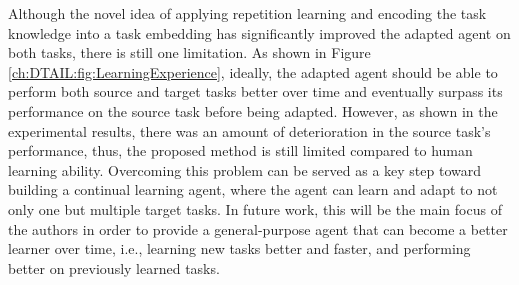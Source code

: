 Although the novel idea of applying repetition learning and encoding the task knowledge into a task embedding has significantly improved the adapted agent on both tasks,
there is still one limitation.
As shown in Figure \ref{ch:DTAIL:fig:LearningExperience},
ideally,
the adapted agent should be able to perform both source and target tasks better over time and eventually surpass its performance on the source task before being adapted.
However,
as shown in the experimental results,
there was an amount of deterioration in the source task's performance,
thus,
the proposed method is still limited compared to human learning ability.
Overcoming this problem can be served as a key step toward building a continual learning agent, where the agent can learn and adapt to not only one but multiple target tasks.
In future work,
this will be the main focus of the authors in order to provide a general-purpose agent that can become a better learner over time,
i.e., learning new tasks better and faster,
and performing better on previously learned tasks.
